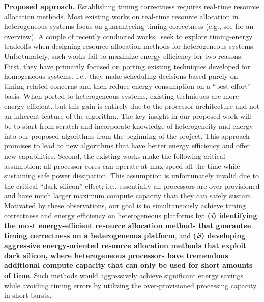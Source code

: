 \vspace{2mm} \noindent \textbf{Proposed approach.} Establishing timing
correctness requires real-time resource allocation methods. Most
existing works on real-time resource allocation in heterogeneous
systems focus on guaranteeing timing correctness (e.g., see
\cite{raravi2014task, raravi2013assigning, niemeier2011partitioned}
for an overview).  A couple of recently conducted
works~\cite{liuenergy, colin2014energy} seek to explore timing-energy
tradeoffs when designing resource allocation methods for heterogeneous
systems.  Unfortunately, such works fail to maximize energy efficiency
for two reasons. First, they have primarily focused on porting
existing techniques developed for homogeneous systems, i.e., they make
scheduling decisions based purely on timing-related concerns and then
reduce energy consumption on a ``best-effort'' basis.  When ported to
heterogeneous systems, existing techniques are more energy efficient,
but this gain is entirely due to the processor architecture and not an
inherent feature of the algorithm. The key insight in our proposed
work will be to start from scratch and incorporate knowledge of
heterogeneity and energy into our proposed algorithms from the
beginning of the project.  This approach promises to lead to new
algorithms that have better energy efficiency and offer new
capabilities. Second, the existing works make the following critical
assumption: all processor cores can operate at max speed all the time
while sustaining safe power dissipation.  This assumption is
unfortunately invalid due to the critical ``dark silicon'' effect;
i.e., essentially all processors are over-provisioned and have much
larger maximum compute capacity than they can safely
sustain\cite{exynos5,DaSi2011,Venkatesh2010}. Motivated by these
observations, our goal is to simultaneously achieve timing correctness
and energy efficiency on heterogeneous platforms by:
\textbf{(\textit{i}) identifying the most energy-efficient resource
  allocation methods that guarantee timing correctness on a
  heterogeneous platform}, and \textbf{(\textit{ii}) developing
  aggressive energy-oriented resource allocation methods that exploit
  dark silicon, where heterogeneous processors have tremendous
  additional compute capacity that can only be used for short amounts
  of time}. Such methods would aggressively achieve significant energy
savings while avoiding timing errors by utilizing the over-provisioned
processing capacity in short bursts.


